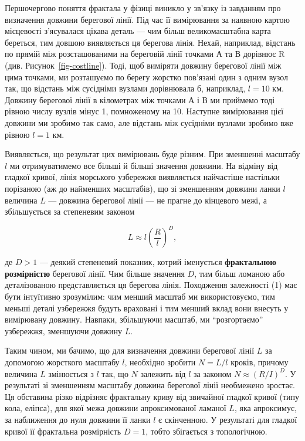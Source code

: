 \documentclass[
  letterpaper,
]{report}
\begin{document}
Першочергово поняття фрактала у фізиці виникло у зв'язку із завданням
про визначення довжини берегової лінії. Під час її вимірювання за
наявною картою місцевості з'ясувалася цікава деталь --- чим більш
великомасштабна карта береться, тим довшою виявляється ця берегова
лінія. Нехай, наприклад, відстань по прямій між розсташованими на
береговій лінії точками А та В дорівнює R (див.
Рисунок~\ref{fig-costline}). Тоді, щоб виміряти довжину берегової лінії
між цима точками, ми розташуємо по берегу жорстко пов'язані один з одним
вузол так, що відстань між сусідніми вузлами дорівнювала б, наприклад,
\(l=10\) км. Довжину берегової лінії в кілометрах між точками А і В ми
приймемо тоді рівною числу вузлів мінус 1, помноженому на 10. Наступне
вимірювання цієї довжини ми зробимо так само, але відстань між сусідніми
вузлами зробимо вже рівною \(l=1\) км.

Виявляється, що результат цих вимірювань буде різним. При зменшенні
масштабу \(l\) ми отримуватимемо все більші й більші значення довжини.
На відміну від гладкої кривої, лінія морського узбережжя виявляється
найчастіше настільки порізаною (аж до найменших масштабів), що зі
зменшенням довжини ланки \(l\) величина \(L\) --- довжина берегової
лінії --- не прагне до кінцевого межі, а збільшується за степеневим
законом

\[ 
L \approx l\left( \frac{R}{l} \right)^{D}, \tag{1}
\]

де \(D > 1\) --- деякий степеневий показник, котрий іменується
\textbf{фрактальною розмірністю} берегової лінії. Чим більше значення
\(D\), тим більш ломаною або деталізованою представляється ця берегова
лінія. Походження залежності (1) має бути інтуїтивно зрозумілим: чим
менший масштаб ми використовуємо, тим меньші деталі узбережжя будуть
враховані і тим менший вклад вони внесуть у вимірювану довжину. Навпаки,
збільшуючи масштаб, ми ``розгортаємо'' узбережжя, зменшуючи довжину
\(L\).

Таким чином, ми бачимо, що для визначення довжини берегової лінії \(L\)
за допомогою жорсткого масштабу \(l\), необхідно зробити \(N=L/l\)
кроків, причому величина \(L\) змінюється з \(l\) так, що \(N\) залежить
від \(l\) за законом \(N \approx (R/I)^{D}\). У результаті зі зменшенням
масштабу довжина берегової лінії необмежено зростає. Ця обставина різко
відрізняє фрактальну криву від звичайної гладкої кривої (типу кола,
еліпса), для якої межа довжини апроксимованої ламаної \(L\), яка
апроксимує, за наближення до нуля довжини її ланки \(l\) є скінченною. У
результаті для гладкої кривої її фрактальна розмірність \(D = 1\), тобто
збігається з топологічною.
\end{document}
